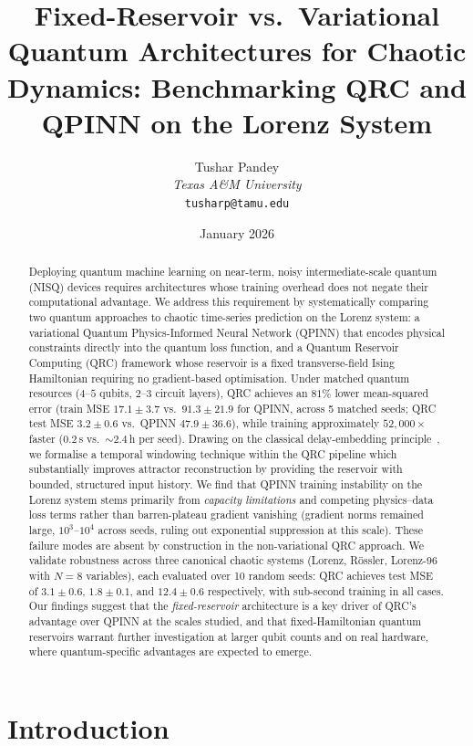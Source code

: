 \documentclass[11pt,a4paper]{article}
\title{Fixed-Reservoir vs.\ Variational Quantum Architectures for Chaotic Dynamics: Benchmarking QRC and QPINN on the Lorenz System}
\author{
    Tushar Pandey\\
    \textit{Texas A\&M University}\\
    \texttt{tusharp@tamu.edu}
}
\date{January 2026}
\begin{document}
\maketitle

\begin{abstract}
Deploying quantum machine learning on near-term, noisy intermediate-scale
quantum (NISQ) devices requires architectures whose training overhead does not
negate their computational advantage.
We address this requirement by systematically comparing two quantum approaches
to chaotic time-series prediction on the Lorenz system: a variational Quantum
Physics-Informed Neural Network (QPINN) that encodes physical constraints
directly into the quantum loss function, and a Quantum Reservoir Computing
(QRC) framework whose reservoir is a fixed transverse-field Ising Hamiltonian
requiring no gradient-based optimisation.
Under matched quantum resources ($4$--$5$ qubits, $2$--$3$ circuit layers),
QRC achieves an $81\%$ lower mean-squared error (train MSE $17.1 \pm 3.7$
vs.\ $91.3 \pm 21.9$ for QPINN, across 5 matched seeds; QRC test MSE
$3.2 \pm 0.6$ vs.\ QPINN $47.9 \pm 36.6$), while training approximately
$52{,}000\times$ faster ($0.2$\,s vs.\ ${\sim}2.4$\,h per seed).
Drawing on the classical delay-embedding principle~\cite{takens1981}, we
formalise a temporal windowing technique within the QRC pipeline which
substantially improves attractor reconstruction by providing the reservoir with
bounded, structured input history.
We find that QPINN training instability on the Lorenz system stems primarily
from \emph{capacity limitations} and competing physics--data loss terms rather
than barren-plateau gradient vanishing (gradient norms remained large,
$10^3$--$10^4$ across seeds, ruling out exponential suppression at this scale).
These failure modes are absent by construction in the non-variational QRC
approach.
We validate robustness across three canonical chaotic systems (Lorenz,
R\"{o}ssler, Lorenz-96 with $N=8$ variables), each evaluated over 10 random
seeds: QRC achieves test MSE of $3.1\pm0.6$, $1.8\pm0.1$, and $12.4\pm0.6$
respectively, with sub-second training in all cases.
Our findings suggest that the \emph{fixed-reservoir} architecture is a key driver of QRC's advantage over QPINN at the scales studied, and that fixed-Hamiltonian quantum reservoirs warrant further investigation at larger qubit counts and on real hardware, where quantum-specific advantages are expected to emerge.
\end{abstract}

\section{Introduction}
\end{document}
